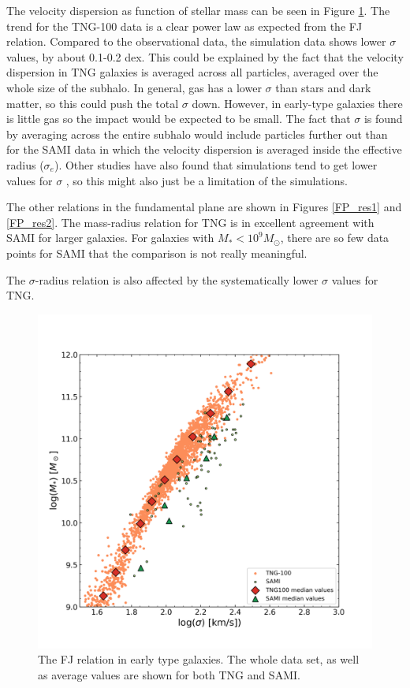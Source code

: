 The velocity dispersion as function of stellar mass can be seen in Figure \ref{FJ_res}. The trend for the TNG-100 data is a clear power law as expected from the FJ relation. Compared to the observational data, the simulation data shows lower $\sigma$ values, by about 0.1-0.2 dex. This could be explained by the fact that the velocity dispersion in TNG galaxies is averaged across all particles, averaged over the whole size of the subhalo. In general, gas has a lower $\sigma$ than stars and dark matter, so this could push the total $\sigma$ down. However, in early-type galaxies there is little gas so the impact would be expected to be small. The fact that $\sigma$ is found by averaging across the entire subhalo would include particles further out than for the SAMI data in which the velocity dispersion is averaged inside the effective radius ($\sigma_{e}$). Other studies have also found that simulations tend to get lower values for $\sigma$ \parencite{Sande2018}, so this might also just be a limitation of the simulations.

The other relations in the fundamental plane are shown in Figures \ref{FP_res1} and \ref{FP_res2}. The mass-radius relation for TNG is in excellent agreement with SAMI for larger galaxies. For galaxies with $M_*<10^9 M_{\odot}$, there are so few data points for SAMI that the comparison is not really meaningful. 

The $\sigma$-radius relation is also affected by the systematically lower $\sigma$ values for TNG. 

\begin{figure}
    \centering
    \includegraphics[width=\textwidth]{images/results_faber_jackson.png}
    \caption{The FJ relation in early type galaxies. The whole data set, as well as average values are shown for both TNG and SAMI.}
    \label{FJ_res}
\end{figure}

